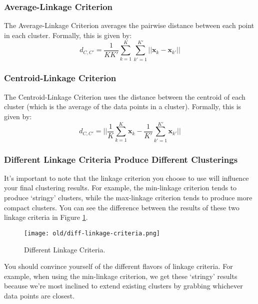 \subsubsection{Average-Linkage Criterion}
The Average-Linkage Criterion averages the pairwise distance between each point in each cluster. Formally, this is given by:
\begin{equation} \label{avg-linkage-crit}
	d_{C, C'} = \frac{1}{K K'} \sum_{k=1}^{K} \sum_{k'=1}^{K'} || \textbf{x}_{k} - \textbf{x}_{k'} ||
\end{equation}

\subsubsection{Centroid-Linkage Criterion}
The Centroid-Linkage Criterion uses the distance between the centroid of each cluster (which is the average of the data points in a cluster). Formally, this is given by:
\begin{equation} \label{cent-linkage-crit}
	d_{C, C'} = || \frac{1}{K} \sum_{k=1}^{K} \textbf{x}_{k} - \frac{1}{K'} \sum_{k'=1}^{K'} \textbf{x}_{k'} ||
\end{equation}

\subsubsection{Different Linkage Criteria Produce Different Clusterings}
It's important to note that the linkage criterion you choose to use will influence your final clustering results. For example, the min-linkage criterion tends to produce `stringy' clusters, while the max-linkage criterion tends to produce more compact clusters. You can see the difference between the results of these two linkage criteria in Figure \ref{fig:diff-linkage-criteria}.

\begin{figure}
    \centering
    \texttt{[image: old/diff-linkage-criteria.png]}
    \caption{Different Linkage Criteria.}
    \label{fig:diff-linkage-criteria}
\end{figure}

\begin{warning}
    You should convince yourself of the different flavors of linkage criteria. For example, when using the min-linkage criterion, we get these `stringy' results because we're most inclined to extend existing clusters by grabbing whichever data points are closest.
\end{warning}

